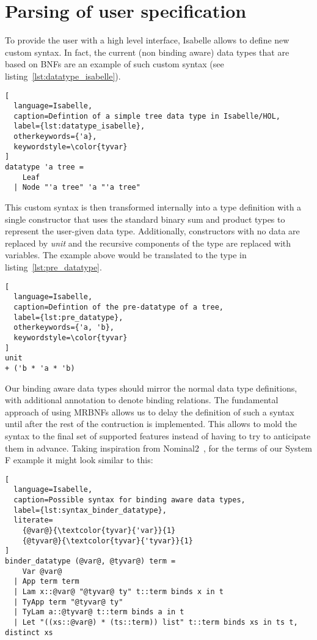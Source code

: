 \section{Parsing of user specification}

To provide the user with a high level interface, Isabelle allows to define new custom syntax. In fact, the current (non binding aware) data types that are based on \acp{BNF} are an example of such custom syntax (see listing~\ref{lst:datatype_isabelle}).

\begin{minipage}{\textwidth}
\begin{lstlisting}[
  language=Isabelle,
  caption=Defintion of a simple tree data type in Isabelle/HOL,
  label={lst:datatype_isabelle},
  otherkeywords={'a},
  keywordstyle=\color{tyvar}
]
datatype 'a tree =
    Leaf
  | Node "'a tree" 'a "'a tree"
\end{lstlisting}
\end{minipage}

This custom syntax is then transformed internally into a type definition with a single constructor that uses the standard binary sum and product types to represent the user-given data type. Additionally, constructors with no data are replaced by \textit{unit} and the recursive components of the type are replaced with variables. The example above would be translated to the type in listing~\ref{lst:pre_datatype}.

\begin{minipage}{\textwidth}
\begin{lstlisting}[
  language=Isabelle,
  caption=Defintion of the pre-datatype of a tree,
  label={lst:pre_datatype},
  otherkeywords={'a, 'b},
  keywordstyle=\color{tyvar}
]
unit
+ ('b * 'a * 'b)
\end{lstlisting}
\end{minipage}

Our binding aware data types should mirror the normal data type definitions, with additional annotation to denote binding relations. The fundamental approach of using \acp{MRBNF} allows us to delay the definition of such a syntax until after the rest of the contruction is implemented. This allows to mold the syntax to the final set of supported features instead of having to try to anticipate them in advance. Taking inspiration from Nominal2~\cite{nominal2}, for the terms of our System F example it might look similar to this:

\begin{lstlisting}[
  language=Isabelle,
  caption=Possible syntax for binding aware data types,
  label={lst:syntax_binder_datatype},
  literate=
    {@var@}{\textcolor{tyvar}{'var}}{1}
    {@tyvar@}{\textcolor{tyvar}{'tyvar}}{1}
]
binder_datatype (@var@, @tyvar@) term =
    Var @var@
  | App term term
  | Lam x::@var@ "@tyvar@ ty" t::term binds x in t
  | TyApp term "@tyvar@ ty"
  | TyLam a::@tyvar@ t::term binds a in t
  | Let "((xs::@var@) * (ts::term)) list" t::term binds xs in ts t, distinct xs
\end{lstlisting}

